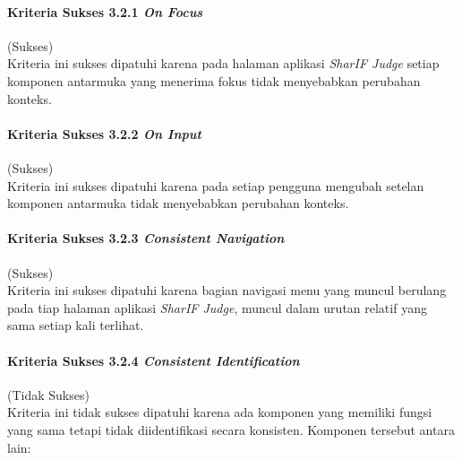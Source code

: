 \paragraph{Kriteria Sukses 3.2.1 \textit{On Focus}}
\label{subsubsec:kepatuhan_kriteria_3.2.1}
(Sukses) \\

Kriteria ini sukses dipatuhi karena pada halaman aplikasi \textit{SharIF Judge} setiap komponen antarmuka yang menerima fokus tidak menyebabkan perubahan konteks.

\paragraph{Kriteria Sukses 3.2.2 \textit{On Input}}
\label{subsubsec:kepatuhan_kriteria_3.2.2}
(Sukses) \\

Kriteria ini sukses dipatuhi karena pada setiap pengguna mengubah setelan komponen antarmuka tidak menyebabkan perubahan konteks.

\paragraph{Kriteria Sukses 3.2.3 \textit{Consistent Navigation}}
\label{subsubsec:kepatuhan_kriteria_3.2.3}
(Sukses) \\

Kriteria ini sukses dipatuhi karena bagian navigasi menu yang muncul berulang pada tiap halaman aplikasi \textit{SharIF Judge}, muncul dalam urutan relatif yang sama setiap kali terlihat.

\paragraph{Kriteria Sukses 3.2.4 \textit{Consistent Identification}}
\label{subsubsec:kepatuhan_kriteria_3.2.4}
(Tidak Sukses) \\

Kriteria ini tidak sukses dipatuhi karena ada komponen yang memiliki fungsi yang sama tetapi tidak diidentifikasi secara konsisten. Komponen tersebut antara lain:

